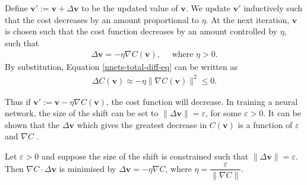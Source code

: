 Define $\mathbf{v}':= \mathbf{v} + \Delta\mathbf{v}$ to be the updated value of $\mathbf{v}$. We update $\mathbf{v}'$ inductively such that the cost decreases by an amount proportional to $\eta$. At the next iteration, $\mathbf{v}$ is chosen such that the cost function decreases by an amount controlled by $\eta$, such that
\begin{align}
	\Delta\mathbf{v} = -\eta \nabla C(\mathbf{v}), \quad \text{ where }\eta > 0.
\end{align}
By substitution, Equation \eqref{nnets-total-diff-eq} can be written as
\begin{align}
	\Delta C(\mathbf{v}) \approx -\eta \|\nabla C(\mathbf{v})\|^2 \le 0.
\end{align}

Thus if $\mathbf{v}' := \mathbf{v} - \eta \nabla C(\mathbf{v})$, the cost function will decrease. In training a neural network, the size of the shift can be set to $\|\Delta\mathbf{v}\| = \varepsilon$, for some $\varepsilon > 0$. It can be shown that the $\Delta\mathbf{v}$ which gives the greatest decrease in $C(\mathbf{v})$ is a function of $\varepsilon$ and $\nabla C$ \cite{Nielson2015}.

\begin{lemma}\label{nnets-graddescminproof}
	Let $\varepsilon > 0$ and suppose the size of the shift is constrained such that $\|\Delta\mathbf{v}\| = \varepsilon$. Then $\nabla C \cdot \Delta\mathbf{v}$ is minimised by $\Delta\mathbf{v} = -\eta\nabla C$, where $\eta = \dfrac{\varepsilon}{\|\nabla C\|}$.
\end{lemma}

